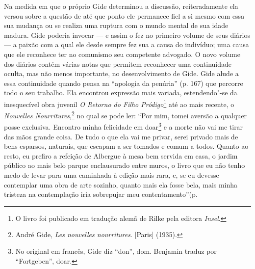 Na medida em que o próprio Gide determinou a discussão, reiteradamente
ela versou sobre a questão de até que ponto ele permanece fiel a si
mesmo com essa sua mudança ou se realiza uma ruptura com o mundo mental
de sua idade madura. Gide poderia invocar --- e assim o fez no primeiro
volume de seus diários --- a paixão com a qual ele desde sempre fez sua a
causa do indivíduo; uma causa que ele reconhece ter no comunismo seu
competente advogado. O novo volume dos diários contém várias notas que
permitem reconhecer uma continuidade oculta, mas não menos importante,
no desenvolvimento de Gide. Gide alude a essa continuidade quando pensa
na ``apologia da penúria'' (p. 167) que percorre todo o seu trabalho.
Ela encontrou expressão mais variada, estendendo"-se da inesquecível obra
juvenil \emph{O Retorno do Filho Pródigo}\footnote{O livro foi
  publicado em tradução alemã de Rilke pela editora \emph{Insel}. \versal{[N. A.]}} até ao
mais recente, o \emph{Nouvelles Nourritures},\footnote{André Gide,
  \emph{Les nouvelles nourritures}. {[}Paris{]} (1935). \versal{[N. A.]}} no qual
se pode ler: ``Por mim, tomei aversão a qualquer posse exclusiva.
Encontro minha felicidade em doar\footnote{No original em
  francês, Gide diz ``don'', dom. Benjamin traduz por ``Fortgeben'',
  doar. \versal{[N. T.]}} e a morte não vai me tirar das mãos grande coisa. De tudo o que
ela vai me privar, serei privado mais de bens esparsos, naturais, que
escapam a ser tomados e comum a todos. Quanto ao resto, eu prefiro a
refeição de Albergue à mesa bem servida em casa, o jardim público ao
mais belo parque enclausurado entre muros, o livro que eu não tenho medo
de levar para uma caminhada à edição mais rara, e, se eu devesse
contemplar uma obra de arte sozinho, quanto mais ela fosse bela, mais
minha tristeza na contemplação iria sobrepujar meu contentamento''(p.
